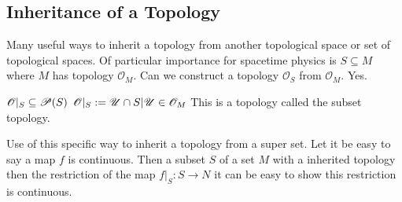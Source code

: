 \documentclass[10pt, oneside]{article}
\newcommand{\O}{\mathcal{O}}
\newcommand{\O}{\mathcal{M}}
\begin{document}
   \subsection*{Inheritance of a Topology}
      Many useful ways to inherit a topology from another topological space or set of topological spaces. Of particular importance for spacetime physics is $S \subseteq M$ where $M$ has topology $\O_M$.
      Can we construct a topology $\O_S$ from $\O_M$. Yes. 
      \begin{Definition}
         $\O |_S \subseteq \mathcal{P}(S) \\$
         $\O|_S := {\mathcal{U} \cap S | \mathcal{U} \in \O_M} \\$
         This is a topology called the subset topology.
      \end{Definition}
      Use of this specific way to inherit a topology from a super set. Let it be easy to say a map $f$ is continuous. Then a subset $S$ of a set $M$ with a inherited topology then the restriction of the map $f|_S: S \to N$ it can be easy to show this restriction is continuous.
\end{document}
